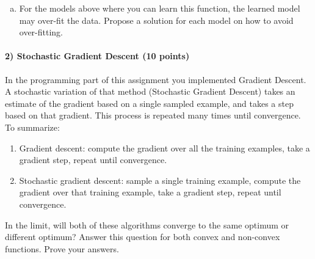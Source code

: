 \documentclass{article}
\begin{document}
\begin{enumerate}[(a)]
	\item For the models above where you can learn this function, the learned model may over-fit the data. Propose a solution for each model on how to avoid over-fitting.
\end{enumerate}

\paragraph{2) Stochastic Gradient Descent (10 points)}
In the programming part of this assignment you implemented Gradient Descent. A stochastic variation of that method (Stochastic Gradient Descent) takes an estimate of the gradient based on a single sampled example, and takes a step based on that gradient. This process is repeated many times until convergence. To summarize:
\begin{enumerate}
	\item Gradient descent: compute the gradient over all the training examples, take a gradient step, repeat until convergence.
	\item Stochastic gradient descent: sample a single training example, compute the gradient over that training example, take a gradient step, repeat until convergence.
\end{enumerate}

In the limit, will both of these algorithms converge to the same optimum or different optimum? Answer this question for both convex and non-convex functions. Prove your answers.
\end{document}
